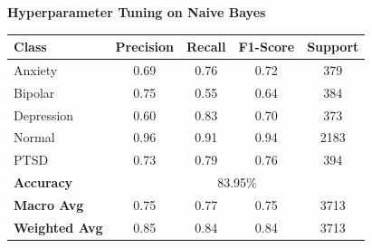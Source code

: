 \begin{center}
    \textbf{Hyperparameter Tuning on Naive Bayes} \\[0.5em]
    \begin{tabular}{|l|c|c|c|c|}
        \hline
        \textbf{Class} & \textbf{Precision} & \textbf{Recall} & \textbf{F1-Score} & \textbf{Support} \\ \hline
        Anxiety        & 0.69               & 0.76            & 0.72              & 379             \\ \hline
        Bipolar        & 0.75               & 0.55            & 0.64              & 384             \\ \hline
        Depression     & 0.60               & 0.83            & 0.70              & 373             \\ \hline
        Normal         & 0.96               & 0.91            & 0.94              & 2183            \\ \hline
        PTSD           & 0.73               & 0.79            & 0.76              & 394             \\ \hline
        \textbf{Accuracy} & \multicolumn{4}{|c|}{83.95\%} \\ \hline
        \textbf{Macro Avg} & 0.75            & 0.77            & 0.75              & 3713            \\ \hline
        \textbf{Weighted Avg} & 0.85         & 0.84            & 0.84              & 3713            \\ \hline
    \end{tabular}
\end{center}

\pagebreak

